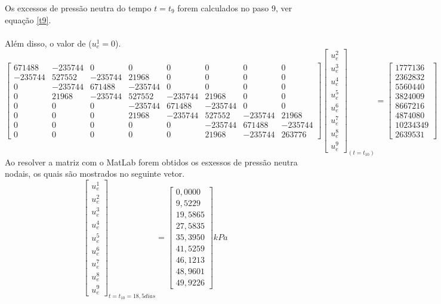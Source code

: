 \documentclass{article} %
\begin{document}
Os excessos de pressão neutra do tempo \(t=t_9\) forem calculados no paso 9, ver equação \ref{t9}.\\
\\
\indent Além disso, o valor de (\(u_e^1=0\)).\\

\begin{equation*}
\begin{bmatrix}
671488& -235744& 0& 0& 0& 0& 0& 0\\
-235744&527552&-235744&21968& 0& 0& 0& 0\\
0&-235744&671488&-235744& 0& 0& 0& 0\\
0&21968&-235744&527552&-235744&21968& 0& 0\\
0&0&0& -235744&671488&-235744& 0& 0\\
0&0&0&21968&-235744&527552&-235744&21968\\
0&0&0&0&0&-235744&671488&-235744\\
0&0&0&0&0&21968&-235744&263776
\end{bmatrix}\begin{bmatrix}
u_e^2\\
u_e^3\\
u_e^4\\
u_e^5\\
u_e^6\\
u_e^7\\
u_e^8\\
u_e^9
\end{bmatrix}_{(t=t_10)}
=\begin{bmatrix}
1777136\\
2362832\\
5560440\\
3824009\\
8667216\\
4874080\\
10234349\\
2639531
\end{bmatrix}
\end{equation*}
\indent Ao resolver a matriz com o MatLab forem obtidos os esxessos de pressão neutra nodais, os quais são mostrados no seguinte vetor.
\begin{equation}\label{t10}
\begin{bmatrix}
u_e^1\\
u_e^2\\
u_e^3\\
u_e^4\\
u_e^5\\
u_e^6\\
u_e^7\\
u_e^8\\
u_e^9
\end{bmatrix}_{t=t_{10}=18,5dias}=\begin{bmatrix}
0,0000\\
9,5229\\
19,5865\\
27,5835\\
35,3950\\
41,5259\\
46,1213\\
48,9601\\
49,9226
\end{bmatrix}kPa
\end{equation}
\end{document}
